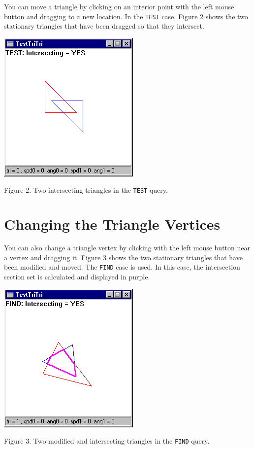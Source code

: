 \documentclass{article}
\newcommand{\Code}[1]{{\tt #1}}
\begin{document}
You can move a triangle by clicking on an interior point with the left mouse
button and dragging to a new location.  In the \Code{TEST} case, Figure 2
shows the two stationary triangles that have been dragged so that they
intersect.
%
%
\begin{center}
  \includegraphics{Figure2.png}

  Figure 2.  Two intersecting triangles in the \Code{TEST} query.
\end{center}

\section{Changing the Triangle Vertices}

You can also change a triangle vertex by clicking with the left mouse button
near a vertex and dragging it.  Figure 3 shows the two stationary triangles
that have been modified and moved.  The \Code{FIND} case is used.  In this
case, the intersection section set is calculated and displayed in purple.
%
%
\begin{center}
  \includegraphics{Figure3.png}

  Figure 3.  Two modified and intersecting triangles in the \Code{FIND} query.
\end{center}
\end{document}
